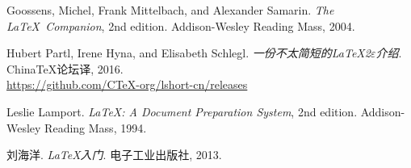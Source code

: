 \begin{thebibliography}{9}

 Goossens, Michel, Frank Mittelbach, and Alexander Samarin.
  \newblock \emph{The \LaTeX\ Companion}, 2nd edition.
  \newblock Addison-Wesley Reading Mass, 2004.

 Hubert Partl, Irene Hyna, and Elisabeth Schlegl.
  \newblock \emph{一份不太简短的\LaTeX 2$\varepsilon$介绍}.
  \newblock China\TeX 论坛译, 2016. \\
  \url{https://github.com/CTeX-org/lshort-cn/releases}
    
 Leslie Lamport.
  \newblock \emph{\LaTeX: A Document Preparation System}, 2nd edition.
  \newblock Addison-Wesley Reading Mass, 1994.
  
 刘海洋.
  \newblock \emph{\LaTeX 入门}.
  \newblock 电子工业出版社, 2013.
  
\end{thebibliography}